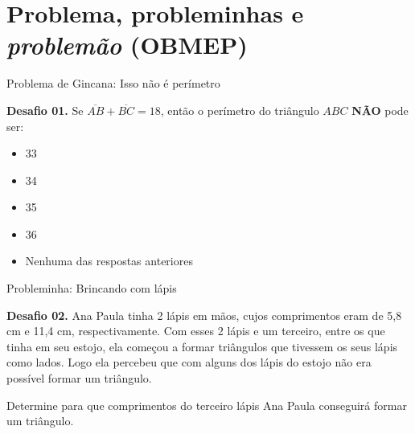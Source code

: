 \documentclass[12pt]{beamer}
\begin{document}
\section{Problema, probleminhas e \textit{problemão} (OBMEP)}

\begin{frame}{Problema de Gincana: Isso não é perímetro}
\begin{exampleblock}{\textbf{Desafio 01.}}
    Se $\overline{AB}+\overline{BC}=18$, então o perímetro do triângulo $ABC$ \textbf{NÃO} pode ser:

    \begin{itemize}
        \item [a)] 33
        \item [b)] 34
        \item [c)] 35
        \item [d)] 36
        \item [e)] Nenhuma das respostas anteriores
    \end{itemize}
\end{exampleblock}
    
\end{frame}

\begin{frame}{Probleminha: Brincando com lápis}

    \begin{exampleblock}{\textbf{Desafio 02.}}
        \justifying
        Ana Paula tinha 2 lápis em mãos, cujos comprimentos eram de 5,8 cm e 11,4 cm, respectivamente. Com esses 2 lápis e um terceiro, entre os que tinha em seu estojo, ela começou a formar triângulos que tivessem os seus lápis como lados. Logo ela percebeu que com alguns dos lápis do estojo não era possível formar um triângulo. 

    \vspace{2mm} 

    Determine para que comprimentos do terceiro lápis Ana Paula conseguirá formar um triângulo.
    \end{exampleblock}
   
\end{frame}
\end{document}
